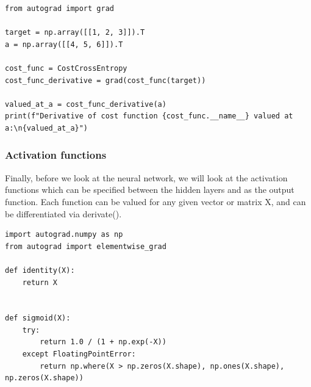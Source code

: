 \documentclass{beamer}
\begin{document}
\begin{frame}
\begin{verbatim}
from autograd import grad

target = np.array([[1, 2, 3]]).T
a = np.array([[4, 5, 6]]).T

cost_func = CostCrossEntropy
cost_func_derivative = grad(cost_func(target))

valued_at_a = cost_func_derivative(a)
print(f"Derivative of cost function {cost_func.__name__} valued at a:\n{valued_at_a}")

\end{verbatim}
\end{frame}

\begin{frame}
\frametitle{Activation functions}

Finally, before we look at the neural network, we will look at the
activation functions which can be specified between the hidden layers
and as the output function. Each function can be valued for any given
vector or matrix X, and can be differentiated via derivate().

















































\begin{verbatim}
import autograd.numpy as np
from autograd import elementwise_grad

def identity(X):
    return X


def sigmoid(X):
    try:
        return 1.0 / (1 + np.exp(-X))
    except FloatingPointError:
        return np.where(X > np.zeros(X.shape), np.ones(X.shape), np.zeros(X.shape))



\end{verbatim}
\end{frame}
\end{document}
